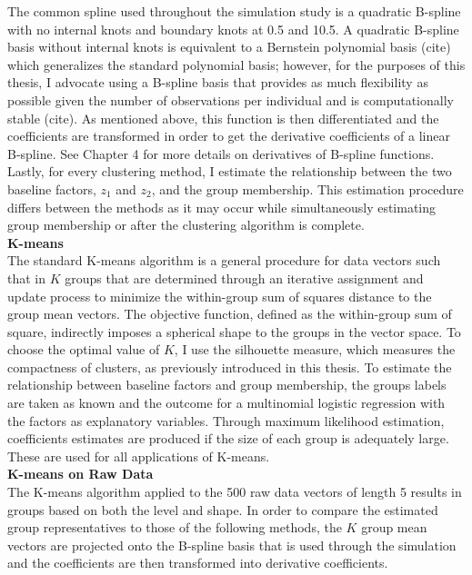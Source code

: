 \documentclass[12pt]{article}
\begin{document}
The common spline used throughout the simulation study is a quadratic B-spline with no internal knots and boundary knots at 0.5 and 10.5. A quadratic B-spline basis without internal knots is equivalent to a Bernstein polynomial basis (cite) which generalizes the standard polynomial basis; however, for the purposes of this thesis, I advocate using a B-spline basis that provides as much flexibility as possible given the number of observations per individual and is computationally stable (cite).  As mentioned above, this function is then differentiated and the coefficients are transformed in order to get the derivative coefficients of a linear B-spline. See Chapter 4 for more details on derivatives of B-spline functions.\\

Lastly, for every clustering method, I estimate the relationship between the two baseline factors, $z_{1}$ and $z_{2}$, and the group membership. This estimation procedure differs between the methods as it may occur while simultaneously estimating group membership or after the clustering algorithm is complete. \\

\noindent \textbf{K-means}\\
The standard K-means algorithm is a general procedure for data vectors such that in $K$ groups that are determined through an iterative assignment and update process to minimize the within-group sum of squares distance to the group mean vectors. The objective function, defined as the within-group sum of square, indirectly imposes a spherical shape to the groups in the vector space. To choose the optimal value of $K$, I use the silhouette measure, which measures the compactness of clusters, as previously introduced in this thesis. To estimate the relationship between baseline factors and group membership, the groups labels are taken as known and the outcome for a multinomial logistic regression with the factors as explanatory variables. Through maximum likelihood estimation, coefficients estimates are produced if the size of each group is adequately large. These are used for all applications of K-means.\\

\textbf{K-means on Raw Data}\\
The K-means algorithm applied to the 500 raw data vectors of length 5 results in groups based on both the level and shape. In order to compare the estimated group representatives to those of the following methods, the $K$ group mean vectors are projected onto the B-spline basis that is used through the simulation and the coefficients are then transformed into derivative coefficients.  \\
\end{document}
